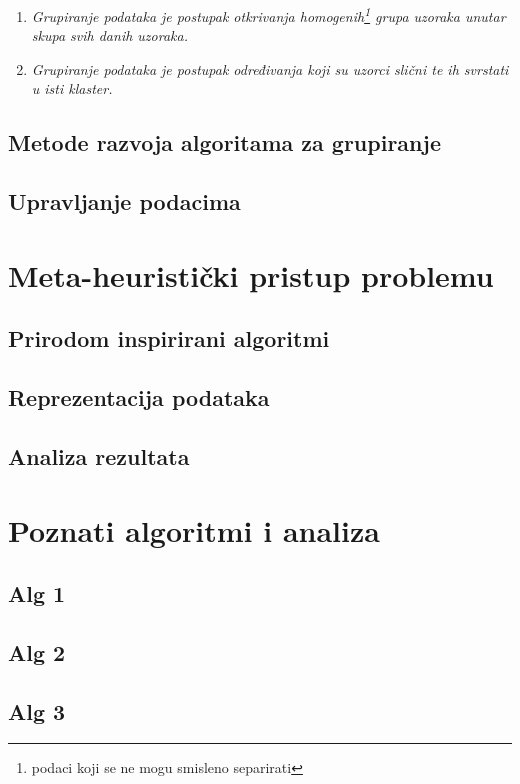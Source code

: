 \documentclass[a4paper,twoside,12pt]{memoir} %
\begin{document}
\begin{enumerate}
\item \textit{Grupiranje podataka je postupak otkrivanja homogenih\footnote{podaci koji se ne mogu smisleno separirati} grupa uzoraka unutar skupa svih danih uzoraka.}

\item \textit{Grupiranje podataka je postupak određivanja koji su uzorci slični te ih svrstati u isti klaster.}
\end{enumerate}
\section[Metode razvoja algoritama za grupiranje][metode-razvoja]{Metode razvoja algoritama za grupiranje}
\section[Upravljanje podacima][upravljanje-podacima]{Upravljanje podacima}

\chapter{Meta-heuristički pristup problemu}
\section[Prirodom inspirirani algoritmi][prirodni-algoritmi]{Prirodom inspirirani algoritmi}
\section{Reprezentacija podataka}
\section{Analiza rezultata}
\chapter{Poznati algoritmi i analiza}
\section{Alg 1}
\section{Alg 2}
\section{Alg 3}
\end{document}
